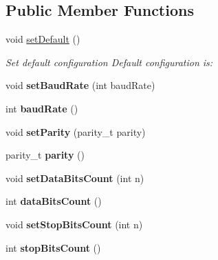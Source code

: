 \subsection*{Public Member Functions}
\begin{DoxyCompactItemize}
\item 
void \hyperlink{classmdt_serial_port_config_acabcdbda285314992582e5ffd413b555}{setDefault} ()
\begin{DoxyCompactList}\small\item\em Set default configuration Default configuration is: \end{DoxyCompactList}\item 
\hypertarget{classmdt_serial_port_config_a065f1875abc81e2aadd42a17d50167b1}{
void {\bfseries setBaudRate} (int baudRate)}
\label{classmdt_serial_port_config_a065f1875abc81e2aadd42a17d50167b1}

\item 
\hypertarget{classmdt_serial_port_config_a57a447f93162816ca19285175cd1ac29}{
int {\bfseries baudRate} ()}
\label{classmdt_serial_port_config_a57a447f93162816ca19285175cd1ac29}

\item 
\hypertarget{classmdt_serial_port_config_a1bc858db75808c23d1233244cff8d4fc}{
void {\bfseries setParity} (parity\_\-t parity)}
\label{classmdt_serial_port_config_a1bc858db75808c23d1233244cff8d4fc}

\item 
\hypertarget{classmdt_serial_port_config_a25f17262cbbcd824de5fff4207007740}{
parity\_\-t {\bfseries parity} ()}
\label{classmdt_serial_port_config_a25f17262cbbcd824de5fff4207007740}

\item 
\hypertarget{classmdt_serial_port_config_a71b78f5bea7c9a8eb66376aa4cee4344}{
void {\bfseries setDataBitsCount} (int n)}
\label{classmdt_serial_port_config_a71b78f5bea7c9a8eb66376aa4cee4344}

\item 
\hypertarget{classmdt_serial_port_config_af4dc5c3e0e718b91a10ec679fa9f910b}{
int {\bfseries dataBitsCount} ()}
\label{classmdt_serial_port_config_af4dc5c3e0e718b91a10ec679fa9f910b}

\item 
\hypertarget{classmdt_serial_port_config_a3c438a1008386bc8eb56c03786136b73}{
void {\bfseries setStopBitsCount} (int n)}
\label{classmdt_serial_port_config_a3c438a1008386bc8eb56c03786136b73}

\item 
\hypertarget{classmdt_serial_port_config_a26873bf852bc57b25f409b212f35e6a1}{
int {\bfseries stopBitsCount} ()}
\label{classmdt_serial_port_config_a26873bf852bc57b25f409b212f35e6a1}


\end{DoxyCompactItemize}
